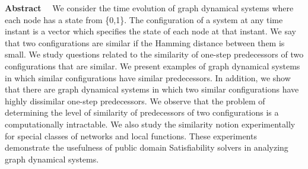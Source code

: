
\noindent
\textbf{Abstract}~~
We consider the time evolution of graph dynamical systems 
where each node has a state from \{0,1\}.
The configuration of a system at any time instant 
is a vector which specifies the state of each node at that instant. 
We say that two configurations are similar 
if the Hamming distance between them is small. 
We study questions related to the similarity of one-step
predecessors of two configurations that are similar.
We present examples of graph dynamical systems in which
similar configurations have similar predecessors.
In addition, we show that there are graph dynamical systems in which
two similar configurations have highly dissimilar
one-step predecessors.
We observe that the problem of determining the level of similarity of 
predecessors of two configurations is a computationally intractable.
We also study the similarity notion experimentally for special classes
of networks and local functions.
These experiments demonstrate the usefulness
of public domain Satisfiability solvers in analyzing 
graph dynamical systems.
